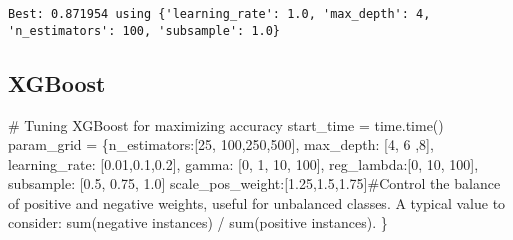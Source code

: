 \documentclass[
  letterpaper,
  DIV=11,
  numbers=noendperiod]{scrreprt}
\newenvironment{Shaded}{\begin{snugshade}}{\end{snugshade}}
\newcommand{\CommentTok}[1]{\textcolor[rgb]{0.37,0.37,0.37}{#1}}
\newcommand{\DecValTok}[1]{\textcolor[rgb]{0.68,0.00,0.00}{#1}}
\newcommand{\FloatTok}[1]{\textcolor[rgb]{0.68,0.00,0.00}{#1}}
\newcommand{\NormalTok}[1]{\textcolor[rgb]{0.00,0.23,0.31}{#1}}
\newcommand{\OperatorTok}[1]{\textcolor[rgb]{0.37,0.37,0.37}{#1}}
\newcommand{\StringTok}[1]{\textcolor[rgb]{0.13,0.47,0.30}{#1}}
\begin{document}
\begin{verbatim}
Best: 0.871954 using {'learning_rate': 1.0, 'max_depth': 4, 'n_estimators': 100, 'subsample': 1.0}
\end{verbatim}

\subsection*{XGBoost}\label{xgboost-1}

\begin{Shaded}
\begin{Highlighting}[]
\CommentTok{\# Tuning XGBoost for maximizing accuracy}
\NormalTok{start\_time }\OperatorTok{=}\NormalTok{ time.time()}
\NormalTok{param\_grid }\OperatorTok{=}\NormalTok{ \{}\StringTok{\textquotesingle{}n\_estimators\textquotesingle{}}\NormalTok{:[}\DecValTok{25}\NormalTok{, }\DecValTok{100}\NormalTok{,}\DecValTok{250}\NormalTok{,}\DecValTok{500}\NormalTok{],}
                \StringTok{\textquotesingle{}max\_depth\textquotesingle{}}\NormalTok{: [}\DecValTok{4}\NormalTok{, }\DecValTok{6}\NormalTok{ ,}\DecValTok{8}\NormalTok{],}
              \StringTok{\textquotesingle{}learning\_rate\textquotesingle{}}\NormalTok{: [}\FloatTok{0.01}\NormalTok{,}\FloatTok{0.1}\NormalTok{,}\FloatTok{0.2}\NormalTok{],}
               \StringTok{\textquotesingle{}gamma\textquotesingle{}}\NormalTok{: [}\DecValTok{0}\NormalTok{, }\DecValTok{1}\NormalTok{, }\DecValTok{10}\NormalTok{, }\DecValTok{100}\NormalTok{],}
               \StringTok{\textquotesingle{}reg\_lambda\textquotesingle{}}\NormalTok{:[}\DecValTok{0}\NormalTok{, }\DecValTok{10}\NormalTok{, }\DecValTok{100}\NormalTok{],}
               \StringTok{\textquotesingle{}subsample\textquotesingle{}}\NormalTok{: [}\FloatTok{0.5}\NormalTok{, }\FloatTok{0.75}\NormalTok{, }\FloatTok{1.0}\NormalTok{]}
                \StringTok{\textquotesingle{}scale\_pos\_weight\textquotesingle{}}\NormalTok{:[}\FloatTok{1.25}\NormalTok{,}\FloatTok{1.5}\NormalTok{,}\FloatTok{1.75}\NormalTok{]}\CommentTok{\#Control the balance of positive and negative weights, useful for unbalanced classes. A typical value to consider: sum(negative instances) / sum(positive instances).}
\NormalTok{             \}}


\end{Highlighting}
\end{Shaded}
\end{document}
